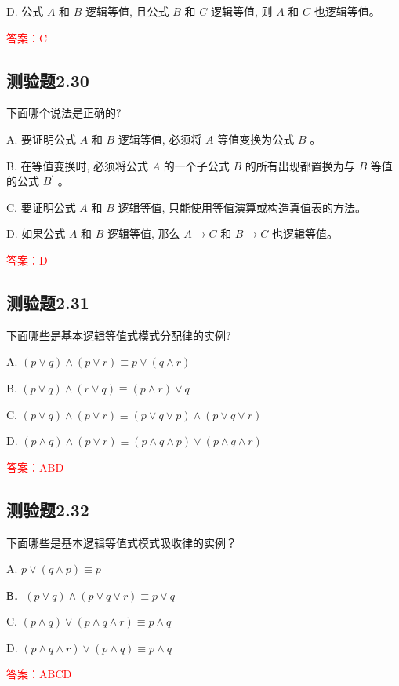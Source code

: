 \documentclass[UTF8, heading=true]{ctexart}
\begin{document}
D. 公式 $A$ 和 $B$ 逻辑等值, 且公式 $B$ 和 $C$ 逻辑等值, 则 $A$ 和 $C$ 也逻辑等值。

\textcolor{red}{答案：C}

\subsection{测验题2.30}

下面哪个说法是正确的?

A. 要证明公式 $A$ 和 $B$ 逻辑等值, 必须将 $A$ 等值变换为公式 $B$ 。

B. 在等值变换时, 必须将公式 $A$ 的一个子公式 $B$ 的所有出现都置换为与 $B$ 等值的公式 $B^{\prime}$ 。

C. 要证明公式 $A$ 和 $B$ 逻辑等值, 只能使用等值演算或构造真值表的方法。

D. 如果公式 $A$ 和 $B$ 逻辑等值, 那么 $A \rightarrow C$ 和 $B \rightarrow C$ 也逻辑等值。

\textcolor{red}{答案：D}

\subsection{测验题2.31}

下面哪些是基本逻辑等值式模式分配律的实例?

A. $(p \vee q) \wedge(p \vee r) \equiv p \vee(q \wedge r)$

B. $(p \vee q) \wedge(r \vee q) \equiv(p \wedge r) \vee q$

C. $(p \vee q) \wedge(p \vee r) \equiv(p \vee q \vee p) \wedge(p \vee q \vee r)$

D. $(p \wedge q) \wedge(p \vee r) \equiv(p \wedge q \wedge p) \vee(p \wedge q \wedge r)$

\textcolor{red}{答案：ABD}

\subsection{测验题2.32}

下面哪些是基本逻辑等值式模式吸收律的实例？

A. $p \vee(q \wedge p) \equiv p$

В．$(p \vee q) \wedge(p \vee q \vee r) \equiv p \vee q$

C. $(p \wedge q) \vee(p \wedge q \wedge r) \equiv p \wedge q$

D. $(p \wedge q \wedge r) \vee(p \wedge q) \equiv p \wedge q$

\textcolor{red}{答案：ABCD}
\end{document}
